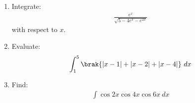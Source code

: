 \begin{enumerate}
\item Integrate:
    \begin{align*}
        \frac{e^x}{\sqrt{5-4e^x-e^{2x}}}
    \end{align*} 
with respect to $x$.  

\item Evaluate: 
    \begin{align*}
        \int_{1}^{5} \brak{\vert{x-1}\vert+\vert{x-2}\vert+\vert{x-4}\vert}~dx
    \end{align*}
 
\item Find:
    \begin{align*}
        \int\cos{2x}\cos{4x}\cos{6x}~dx
    \end{align*}


 \end{enumerate}

